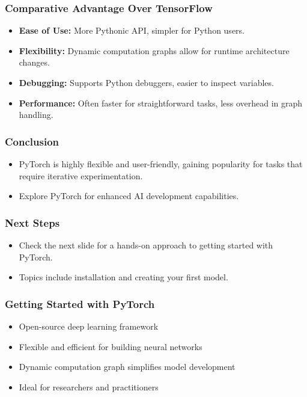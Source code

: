 \documentclass{beamer}
\begin{document}
\begin{frame}
    \frametitle{Comparative Advantage Over TensorFlow}
    \begin{itemize}
        \item \textbf{Ease of Use:} More Pythonic API, simpler for Python users.
        \item \textbf{Flexibility:} Dynamic computation graphs allow for runtime architecture changes.
        \item \textbf{Debugging:} Supports Python debuggers, easier to inspect variables.
        \item \textbf{Performance:} Often faster for straightforward tasks, less overhead in graph handling.
    \end{itemize}
\end{frame}

\begin{frame}
    \frametitle{Conclusion}
    \begin{itemize}
        \item PyTorch is highly flexible and user-friendly, gaining popularity for tasks that require iterative experimentation.
        \item Explore PyTorch for enhanced AI development capabilities.
    \end{itemize}
\end{frame}

\begin{frame}
    \frametitle{Next Steps}
    \begin{itemize}
        \item Check the next slide for a hands-on approach to getting started with PyTorch.
        \item Topics include installation and creating your first model.
    \end{itemize}
\end{frame}

\begin{frame}[fragile]
    \frametitle{Getting Started with PyTorch}
    \begin{itemize}
        \item Open-source deep learning framework
        \item Flexible and efficient for building neural networks
        \item Dynamic computation graph simplifies model development
        \item Ideal for researchers and practitioners
    \end{itemize}
\end{frame}
\end{document}

